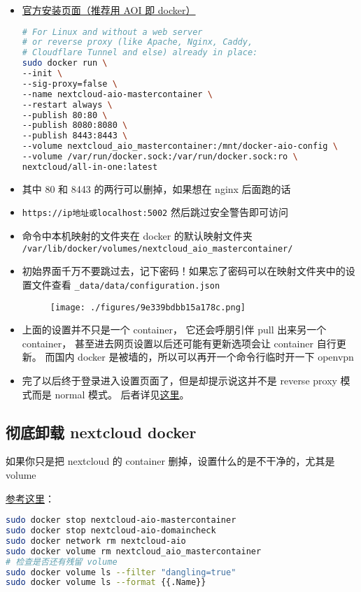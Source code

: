 
\begin{itemize}
\item \href{https://nextcloud.com/install/}{官方安装页面（推荐用 AOI 即 docker）}
\begin{lstlisting}[language=bash]
# For Linux and without a web server
# or reverse proxy (like Apache, Nginx, Caddy,
# Cloudflare Tunnel and else) already in place:
sudo docker run \
--init \
--sig-proxy=false \
--name nextcloud-aio-mastercontainer \
--restart always \
--publish 80:80 \
--publish 8080:8080 \
--publish 8443:8443 \
--volume nextcloud_aio_mastercontainer:/mnt/docker-aio-config \
--volume /var/run/docker.sock:/var/run/docker.sock:ro \
nextcloud/all-in-one:latest
\end{lstlisting}
\item 其中 80 和 8443 的两行可以删掉，如果想在 nginx 后面跑的话
\item \verb`https://ip地址或localhost:5002` 然后跳过安全警告即可访问
\item 命令中本机映射的文件夹在 docker 的默认映射文件夹 \verb`/var/lib/docker/volumes/nextcloud_aio_mastercontainer/`
\item 初始界面千万不要跳过去，记下密码！如果忘了密码可以在映射文件夹中的设置文件查看 \verb`_data/data/configuration.json`
\begin{figure}[ht]
\centering
\texttt{[image: ./figures/9e339bdbb15a178c.png]}
\caption{} \label{fig_nxclou_1}
\end{figure}
\item 上面的设置并不只是一个 container， 它还会呼朋引伴 pull 出来另一个 container， 甚至进去网页设置以后还可能有更新选项会让 container 自行更新。 而国内 docker 是被墙的，所以可以再开一个命令行临时开一下 openvpn
\item 完了以后终于登录进入设置页面了，但是却提示说这并不是 reverse proxy 模式而是 normal 模式。 后者详见\href{https://github.com/nextcloud/all-in-one/blob/main/reverse-proxy.md}{这里}。
\end{itemize}

\subsection{彻底卸载 nextcloud docker}
如果你只是把 nextcloud 的 container 删掉，设置什么的是不干净的，尤其是 volume

\href{https://github.com/nextcloud/all-in-one#how-to-properly-reset-the-instance}{参考这里}：
\begin{lstlisting}[language=bash]
sudo docker stop nextcloud-aio-mastercontainer
sudo docker stop nextcloud-aio-domaincheck
sudo docker network rm nextcloud-aio
sudo docker volume rm nextcloud_aio_mastercontainer
# 检查是否还有残留 volume
sudo docker volume ls --filter "dangling=true"
sudo docker volume ls --format {{.Name}}
\end{lstlisting}
